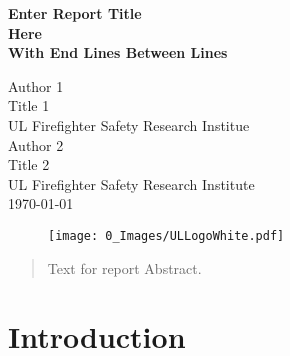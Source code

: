 \documentclass{article}
\begin{document}
	\begin{titlepage}
		
		\pagecolor{ULred}\afterpage{\nopagecolor}
		


			\vspace*{23\baselineskip} 

		\huge
		\begin{adjustwidth}{-0.5in}{-0in}
		\color{white}
		\textbf{Enter Report Title \\ Here \\ With End Lines Between Lines\\}
		\end{adjustwidth}
		\begin{adjustwidth}{-0.5in}{}
		\color{white}
		\vspace{.2in}
		\large
		Author 1 \\
		Title 1 \\
		UL Firefighter Safety Research Institue \\
		\vspace*{\baselineskip}
		Author 2\\
		Title 2 \\
		UL Firefighter Safety Research Institute \\ 
		\vspace*{\baselineskip}
		\today
		\vspace*{\baselineskip}
		\vspace{.2in}
		\begin{figure}[h]
			\hspace*{-0.5in}\texttt{[image: 0\_Images/ULLogoWhite.pdf]}
		\end{figure}
		\end{adjustwidth}
	\end{titlepage}

\renewcommand{\abstractname}{Executive Summary}
\setlength{\emergencystretch}{5pt}

\begin{abstract}
Text for report Abstract.

\end{abstract}

\newpage

\tableofcontents

\newpage

\section*{Introduction}
\end{document}

